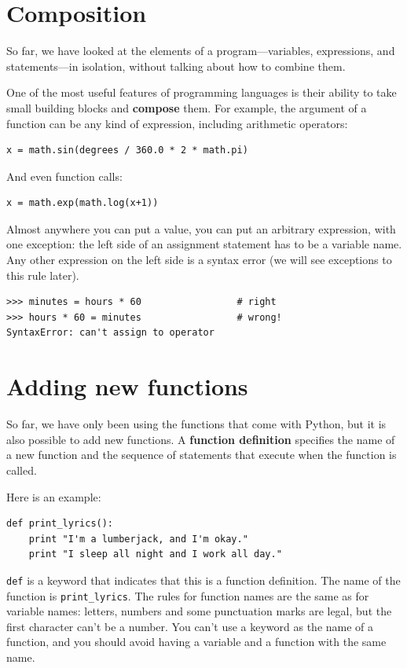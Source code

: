 \documentclass[10pt]{book}
\begin{document}
\section{Composition}

So far, we have looked at the elements of a program---variables,
expressions, and statements---in isolation, without talking about how to
combine them.

One of the most useful features of programming languages is their
ability to take small building blocks and {\bf compose} them.  For
example, the argument of a function can be any kind of expression,
including arithmetic operators:

\begin{verbatim}
x = math.sin(degrees / 360.0 * 2 * math.pi)
\end{verbatim}
%
And even function calls:

\begin{verbatim}
x = math.exp(math.log(x+1))
\end{verbatim}
%
Almost anywhere you can put a value, you can put an arbitrary
expression, with one exception: the left side of an assignment
statement has to be a variable name.  Any other expression on the left
side is a syntax error (we will see exceptions to this rule
later).

\begin{verbatim}
>>> minutes = hours * 60                 # right
>>> hours * 60 = minutes                 # wrong!
SyntaxError: can't assign to operator
\end{verbatim}
%


\section{Adding new functions}

So far, we have only been using the functions that come with Python,
but it is also possible to add new functions.
A {\bf function definition} specifies the name of a new function and
the sequence of statements that execute when the function is called.

Here is an example:

\begin{verbatim}
def print_lyrics():
    print "I'm a lumberjack, and I'm okay."
    print "I sleep all night and I work all day."
\end{verbatim}
%
{\tt def} is a keyword that indicates that this is a function
definition.  The name of the function is \verb"print_lyrics".  The
rules for function names are the same as for variable names: letters,
numbers and some punctuation marks are legal, but the first character
can't be a number.  You can't use a keyword as the name of a function,
and you should avoid having a variable and a function with the same
name.
\end{document}
